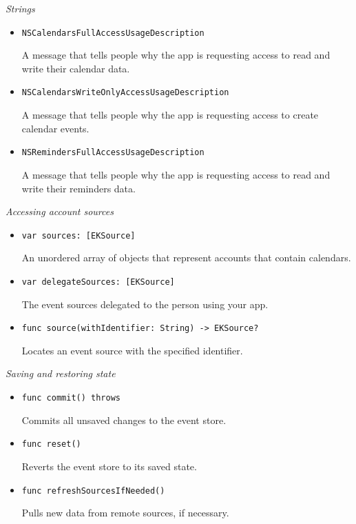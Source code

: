 \documentclass{article}
\begin{document}
\textit{Strings}
\begin{itemize}
    \item \texttt{NSCalendarsFullAccessUsageDescription}

    A message that tells people why the app is requesting access to read and write their calendar data.
    \item \texttt{NSCalendarsWriteOnlyAccessUsageDescription}

    A message that tells people why the app is requesting access to create calendar events.
    \item \texttt{NSRemindersFullAccessUsageDescription}

    A message that tells people why the app is requesting access to read and write their reminders data.
\end{itemize}

\textit{Accessing account sources}
\begin{itemize}
    \item \texttt{var sources: [EKSource]}

    An unordered array of objects that represent accounts that contain calendars.
    \item \texttt{var delegateSources: [EKSource]}

    The event sources delegated to the person using your app.
    \item \texttt{func source(withIdentifier: String) -> EKSource?}

    Locates an event source with the specified identifier.
\end{itemize}

\textit{Saving and restoring state}
\begin{itemize}
    \item \texttt{func commit() throws}

    Commits all unsaved changes to the event store.
    \item \texttt{func reset()}

    Reverts the event store to its saved state.
    \item \texttt{func refreshSourcesIfNeeded()}

    Pulls new data from remote sources, if necessary.
\end{itemize}
\end{document}
